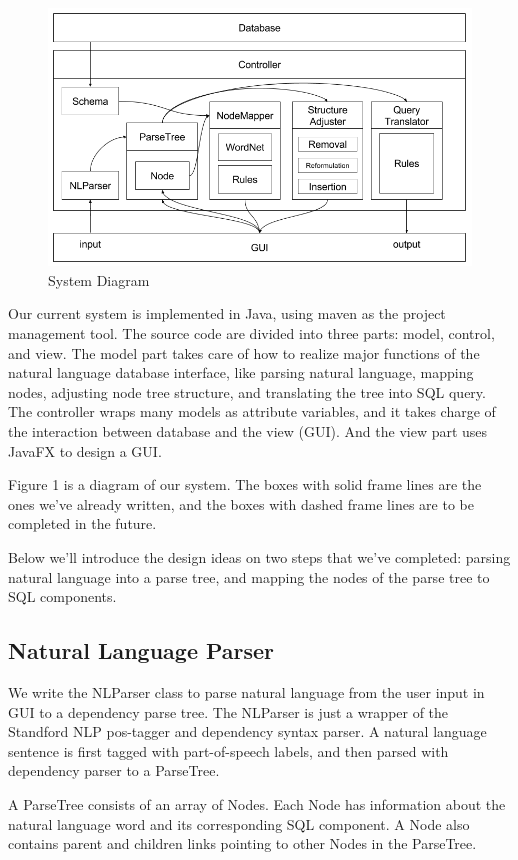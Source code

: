 \documentclass[twocolumn]{article}
\begin{document}
\begin{figure}[ht]
  \centering
  \includegraphics[width=0.8\linewidth]{figures/nlidb_system_diagram.png}
  \caption{System Diagram}
\end{figure}

Our current system is implemented in Java, using maven as the project management tool. The source code are divided into three parts: model, control, and view. The model part takes care of how to realize major functions of the natural language database interface, like parsing natural language, mapping nodes, adjusting node tree structure, and translating the tree into SQL query. The controller wraps many models as attribute variables, and it takes charge of the interaction between database and the view (GUI). And the view part uses JavaFX to design a GUI.

Figure 1 is a diagram of our system. The boxes with solid frame lines are the ones we've already written, and the boxes with dashed frame lines are to be completed in the future. 

Below we’ll introduce the design ideas on two steps that we’ve completed: parsing natural language into a parse tree, and mapping the nodes of the parse tree to SQL components.

\subsection{Natural Language Parser}
We write the NLParser class to parse natural language from the user input in GUI to a dependency parse tree. The NLParser is just a wrapper of the Standford NLP pos-tagger and dependency syntax parser. A natural language sentence is first tagged with part-of-speech labels, and then parsed with dependency parser to a ParseTree.

A ParseTree consists of an array of Nodes. Each Node has information about the natural language word and its corresponding SQL component. A Node also contains parent and children links pointing to other Nodes in the ParseTree.
\end{document}
